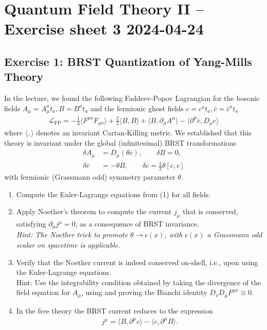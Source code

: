 \documentclass[10pt,a4paper]{article}
\theoremstyle{definition}
\begin{document}
\section{Quantum Field Theory II – Exercise sheet 3 2024-04-24}
\subsection{Exercise 1: BRST Quantization of Yang-Mills Theory}
{\color{blue}
In the lecture, we found the following Faddeev-Popov Lagrangian for the bosonic fields $A_\mu = A^a_\mu t_a, B=B^a t_a$ and the fermionic ghost fields $c= c^a t_a, \bar{c}=\bar{c}^a t_a$
\begin{align}
\mathcal{L}_\text{FP}=-\frac{1}{4}\langle F^{\mu\nu}F_{\mu\nu}\rangle+\frac{\xi}{2}\langle B,B\rangle+\langle B,\partial_\mu A^\mu\rangle-\langle \partial^\mu\bar{c},D_\mu c\rangle
\tag{1}
\end{align}
where $\langle,\rangle$ denotes an invariant Cartan-Killing metric. We established that this theory is invariant under the global (infinitesimal) BRST transformations
\begin{align*}
\delta A_\mu&=D_\mu(\theta c), \qquad \delta B=0,\\
\delta \bar{c}&=-\theta B, \qquad \delta c=\frac{1}{2}\theta[c,c]
\end{align*}
with fermionic (Grassmann odd) symmetry parameter $\theta$.
\begin{enumerate}
\item Compute the Euler-Lagrange equations from (1) for all fields.
\item Apply Noether’s theorem to compute the current $j_\mu$ that is conserved, satisfying $\partial_\mu j^\mu=0$, as a consequence of BRST invariance.\\
{\it Hint: The Noether trick to promote $\theta\rightarrow\epsilon(x)$, with $\epsilon(x)$ a Grassmann odd scalar on spacetime is applicable.}
\item Verify that the Noether current is indeed conserved on-shell, i.e., upon using the Euler-Lagrange equations.\\
Hint: Use the integrability condition obtained by taking the divergence of the field equation for $A_\mu$, using and proving the Bianchi identity $D_\nu D_\mu F^{\mu\nu}\equiv0$.
\item In the free theory the BRST current reduces to the expression
\begin{align*}
j^\mu=\langle B,\partial^\mu c\rangle-\langle c,\partial^\mu B\rangle.
\end{align*}

\end{enumerate}}
\end{document}
